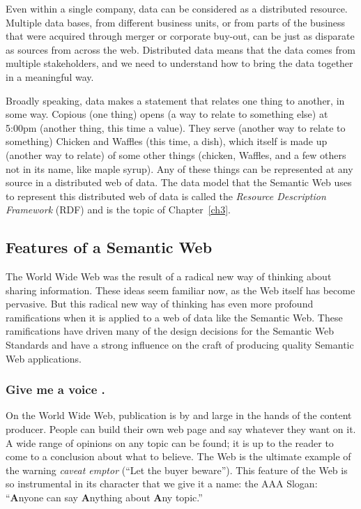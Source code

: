 Even within a single company, data can be considered as a distributed resource. Multiple
data bases, from different business units, or from parts of the business that 
were acquired through merger or corporate buy-out, can be just as disparate as 
sources from across the web.  Distributed data means that the data comes from 
multiple stakeholders, and we need to understand how to bring the data together
in a meaningful way.

Broadly speaking, data makes a statement that relates one thing to another, in some 
way.  Copious (one thing) opens (a way to relate to something else) at 5:00pm (another
thing, this time a value).  They serve (another way to relate to something) Chicken 
and Waffles (this time, a dish), which itself is made up (another way to relate) of
some other things (chicken, Waffles, and a few others not in its name, like 
maple syrup).  Any of these things can be represented at any source in a distributed web of data. 
The data model that the Semantic Web
uses to represent this distributed web of data is
called the \emph{Resource Description Framework} (RDF) and is the topic of
Chapter~\ref{ch3}.  



 


\subsection{Features of a Semantic Web}

The World Wide Web was the result of a radical new way of thinking about
sharing information. These ideas seem familiar now, as the Web itself
has become pervasive. But this radical new way of thinking has even more
profound ramifications when it is applied to a web of data like the
Semantic Web. These ramifications have driven many of the design
decisions for the Semantic Web Standards and have a strong influence on
the craft of producing quality Semantic Web applications.




\subsubsection{Give me a voice .}

On the World Wide Web, publication is by and large in the hands of the
content producer. People can build their own web page and say whatever
they want on it. A wide range of opinions on any topic can be found; it
is up to the reader to come to a conclusion about what to believe. The
Web is the ultimate example of the warning \emph{caveat emptor} (``Let
the buyer beware''). This feature of the Web is so instrumental in its
character that we give it a name: the AAA Slogan: ``\textbf{A}nyone can
say \textbf{A}nything about \textbf{A}ny topic.''

